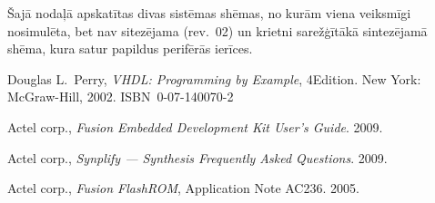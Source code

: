 \documentclass[12pt,a4paper]{article} %
\begin{document}
	Šajā nodaļā apskatītas divas sistēmas shēmas, no kurām viena veiksmīgi
	nosimulēta, bet nav sitezējama (rev.~02) un krietni sarežģītākā
	sintezējamā shēma, kura satur papildus perifērās ierīces.
	
	 \clearpage %
	 \clearpage %
	
	
	
	\clearpage
	\raggedright
	\begin{thebibliography}{9}
			Douglas L.~Perry,
			\textit{VHDL: Programming by Example}, 4\nth Edition. \linebreak[2]
			New York: McGraw-Hill, 2002. ISBN~0-07-140070-2
		
			Actel corp.,
			\textit{Fusion Embedded Development Kit User's Guide}. %
			2009.
		
			Actel corp.,
			\textit{Synplify — Synthesis Frequently Asked Questions}. %
			2009.
		
			Actel corp.,
			\textit{Fusion FlashROM}, Application Note AC236. %
			2005.
		
		
	\end{thebibliography}
	
\end{document}
